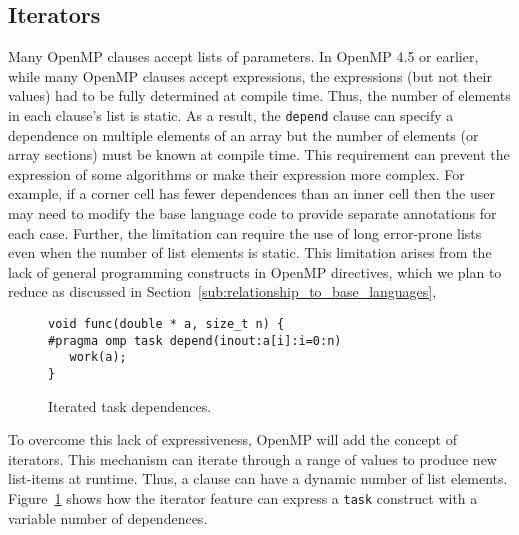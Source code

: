 \subsection{Iterators}
\label{sub:iterators}

Many OpenMP clauses accept lists of parameters. In OpenMP 4.5 or earlier, 
while many OpenMP clauses accept expressions, the expressions (but not 
their values) had to be fully determined at compile time. Thus, the number 
of elements in each clause's list is static. As a result,
the \texttt{depend} clause can specify a dependence on multiple elements
of an array but the number of elements (or array sections) must be known
at compile time. This requirement can prevent the expression of some
algorithms or make their expression more complex.  For example, if a 
corner cell has fewer dependences than an inner cell then the user may need 
to modify the base language code to provide separate annotations for each case.
Further, the limitation can require the use of long 
error-prone lists even when the number of list elements is static. This 
limitation arises from the lack of general programming constructs in 
OpenMP directives, which we plan to reduce as discussed in 
Section~\ref{sub:relationship_to_base_languages}, 

\begin{figure}
\begin{verbatim}
void func(double * a, size_t n) {
#pragma omp task depend(inout:a[i]:i=0:n)
   work(a);
}
\end{verbatim}
\caption{Iterated task dependences.\label{fig:iterators}}
\end{figure}

To overcome this lack of expressiveness, OpenMP will add the concept of
iterators. This mechanism can iterate through a range of values to produce new
list-items at runtime. Thus, a clause can have a dynamic number of list
elements. Figure~\ref{fig:iterators} shows how the iterator feature can express
a \texttt{task} construct with a variable number of dependences.
